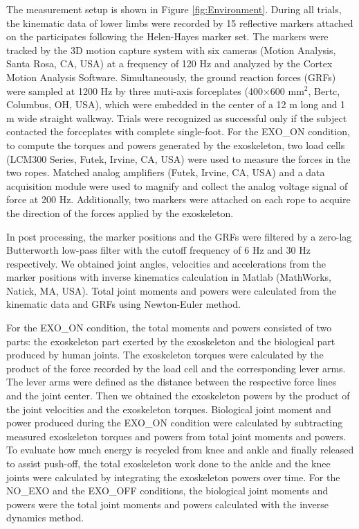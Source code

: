 \documentclass[twocolumn,cleanfoot,10pt]{asme2ej}
\begin{document}
The measurement setup is shown in Figure \ref{fig:Environment}.
During all trials, the kinematic data of lower limbs were recorded by 15 reflective markers attached on the participates following the Helen-Hayes marker set\cite{RN24}.
The markers were tracked by the 3D motion capture system with six cameras (Motion Analysis, Santa Rosa, CA, USA) at a frequency of 120 Hz and analyzed by the Cortex Motion Analysis Software.
Simultaneously, the ground reaction forces (GRFs) were sampled at 1200 Hz by three muti-axis forceplates (400$\times$600 mm$^{2}$, Bertc, Columbus, OH, USA), which were embedded in the center of a 12 m long and 1 m wide straight walkway.
Trials were recognized as successful only if the subject contacted the forceplates with complete single-foot.
For the EXO\_ON condition, to compute the torques and powers generated by the exoskeleton, two load cells (LCM300 Series, Futek, Irvine, CA, USA) were used to measure the forces in the two ropes.
Matched analog amplifiers (Futek, Irvine, CA, USA) and a data acquisition module were used to magnify and collect the analog voltage signal of force at 200 Hz.
Additionally, two markers were attached on each rope to acquire the direction of the forces applied by the exoskeleton.

In post processing, the marker positions and the GRFs were filtered by a zero-lag Butterworth low-pass filter with the cutoff frequency of 6 Hz and 30 Hz respectively.
We obtained joint angles, velocities and accelerations from the marker positions with inverse kinematics calculation in Matlab (MathWorks, Natick, MA, USA).
Total joint moments and powers were calculated from the kinematic data and GRFs using Newton-Euler method. 

For the EXO\_ON condition, the total moments and powers consisted of two parts: the exoskeleton part exerted by the exoskeleton and the biological part produced by human joints. The exoskeleton torques were calculated by the product of the force recorded by the load cell and the corresponding lever arms.
The lever arms were defined as the distance between the respective force lines and the joint center.
Then we obtained the exoskeleton powers by the product of the joint velocities and the exoskeleton torques.
Biological joint moment and power produced during the EXO\_ON condition were calculated by subtracting measured exoskeleton torques and powers from total joint moments and powers.
To evaluate how much energy is recycled from knee and ankle and finally released to assist push-off, the total exoskeleton work done to the ankle and the knee joints were calculated by integrating the exoskeleton powers over time.
For the NO\_EXO and the EXO\_OFF conditions, the biological joint moments and powers were the total joint moments and powers calculated with the inverse dynamics method.
\end{document}
